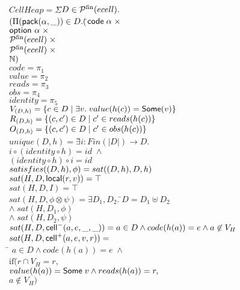 \documentclass[preprint,natbib]{sigplanconf}
\begin{document}
\begin{figure}
\begin{tabbing}
$CellHeap = \Sigma$\=$ D \in \mathcal{P}^{\mathrm{fin}}({ecell}).$ \\
               \>$(\Pi (\mbox{\textsf{{pack}}}({\alpha}, {\_})) \in D. ($\=${\mbox{\textsf{{code}}}\;{\alpha}} \;\times$ \\
               \>                          \>${\mbox{\textsf{{option }}}{\alpha}} \;\times$ \\
               \>                          \>${\mathcal{P}^{\mathrm{fin}}({ecell})} \;\times$ \\
               \>                          \>${\mathcal{P}^{\mathrm{fin}}({ecell})} \;\times$ \\
               \>                          \>$\mathbb{N})$ \\[1em]
       

$code = \pi_1$ \\
$value = \pi_2$ \\
$reads = \pi_3$ \\
$obs = \pi_4$ \\
$identity = \pi_5$ \\[1em]

$V_{(D, h)} = \{{{c \in D}\;|\;{\exists v.\; value(h(c)) = \mbox{\textsf{{Some}}}(v)}}\}$ \\
$R_{(D, h)} = \{{{(c,c') \in D}\;|\;{ c' \in reads(h(c)) }}\}$ \\
$O_{(D, h)} = \{{{(c,c') \in D}\;|\;{ c' \in obs(h(c)) }}\}$ \\[1em]

$unique(D,h) = \exists$\=$i : Fin(|D|) \to D.$\\
                       \>$i \circ (identity \circ h) = id \; \land$ \\
                       \>$(identity \circ h) \circ i = id$ \\[1em]

$satisfies({(D,h)}, {\phi}) = sat((D,h), D, h)$ \\[1em]

$sat(H, D, \mbox{\textsf{{local}}}({r}, {v})) = \top$ \\
$sat(H, D, I) = \top$ \\
$sat(H, D, \phi \otimes \psi) = \exists D_1, D_2.\;$\=$D = D_1 \uplus D_2$ \\
                                                    \>$\land\; sat(H, D_1, \phi)$ \\
                                                    \>$\land\; sat(H, D_2, \psi)$ \\
$sat(H, D, \mbox{\textsf{{cell}}}^{-}({a}, {e}, {\_}, {\_})) = a \in D \land code(h(a)) = e \land a \not \in V_H$ \\
$sat(H, D, \mbox{\textsf{{cell}}}^{+}({a}, {e}, {v}, {r})) = $ \\
\qquad\= $a \in D \land code(h(a)) = e \;\land$ \\
      \>$\mathrm{if}($\=$r \cap V_H = r,$ \\
      \>     \>$value(h(a)) = \mbox{\textsf{{Some}}}\;v \land reads(h(a)) = r,$ \\
      \>     \>$a \not\in V_H)$\\[1em]
 


\end{tabbing}
\end{figure}
\end{document}
